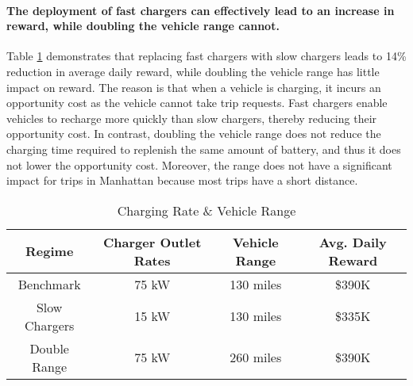 \paragraph{The deployment of fast chargers can effectively lead to an increase in reward, while doubling the vehicle range cannot.} Table \ref{tab:charging-rate-range} demonstrates that replacing fast chargers with slow chargers leads to 14\% reduction in average daily reward, while doubling the vehicle range has little impact on reward. The reason is that when a vehicle is charging, it incurs an opportunity cost as the vehicle cannot take trip requests. Fast chargers enable vehicles to recharge more quickly than slow chargers, thereby reducing their opportunity cost. In contrast, doubling the vehicle range does not reduce the charging time required to replenish the same amount of battery, and thus it does not lower the opportunity cost. Moreover, the range does not have a significant impact for trips in Manhattan because most trips have a short distance.


\begin{table}[htb]
    \centering
    \begin{tabular}{|c|c|c|c|}
        \hline
        Regime & Charger Outlet Rates & Vehicle Range & Avg. Daily Reward\\
        \hline
        Benchmark & 75 kW & 130 miles & \$390K\\ %
        Slow Chargers & 15 kW & 130 miles & \$335K\\ %
        Double Range & 75 kW & 260 miles & \$390K \\%
        \hline
    \end{tabular}
    \caption{Charging Rate \& Vehicle Range}
    \label{tab:charging-rate-range}
\end{table}
